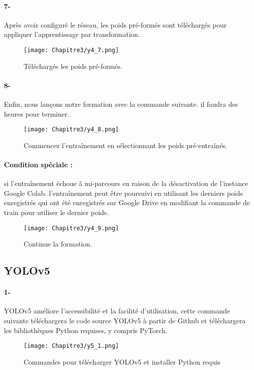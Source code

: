      \paragraph{7-} Après avoir configuré le réseau, les poids pré-formés sont téléchargés pour appliquer l'apprentissage par transformation.
     \begin{figure}[H]
               \centering
               \texttt{[image: Chapitre3/y4\_7.png]}
               \caption{Téléchargés les poids pré-formés.}
               \label{y4_7}
               \end{figure}
      
     \paragraph{8-} Enfin, nous lançons notre formation avec la commande suivante. il faudra des heures pour terminer.
     \begin{figure}[H]
               \centering
               \texttt{[image: Chapitre3/y4\_8.png]}
               \caption{Commencez l'entraînement en sélectionnant les poids pré-entraînés.}
               \label{y4_8}
               \end{figure}
      
     \paragraph{Condition spéciale :} si l'entraînement échoue à mi-parcours en raison de la désactivation de l'instance Google Colab. l'entraînement peut être poursuivi en utilisant les derniers poids enregistrés qui ont été enregistrés sur Google Drive en modifiant la commande de train pour utiliser le dernier poids.
     \begin{figure}[H]
               \centering
               \texttt{[image: Chapitre3/y4\_9.png]}
               \caption{Continue la formation.}
               \label{y4_9}
               \end{figure}
      
               

     \subsection{YOLOv5}
     \paragraph{1-} YOLOv5 améliore l'accessibilité et la facilité d'utilisation, cette commande suivante téléchargera le code source YOLOv5 à partir de Github et téléchargera les bibliothèques Python requises, y compris PyTorch.
     \begin{figure}[H]
               \centering
               \texttt{[image: Chapitre3/y5\_1.png]}
               \caption{Commandes pour télécharger YOLOv5 et installer Python requis}
               \label{y5_1}
               \end{figure}
               
